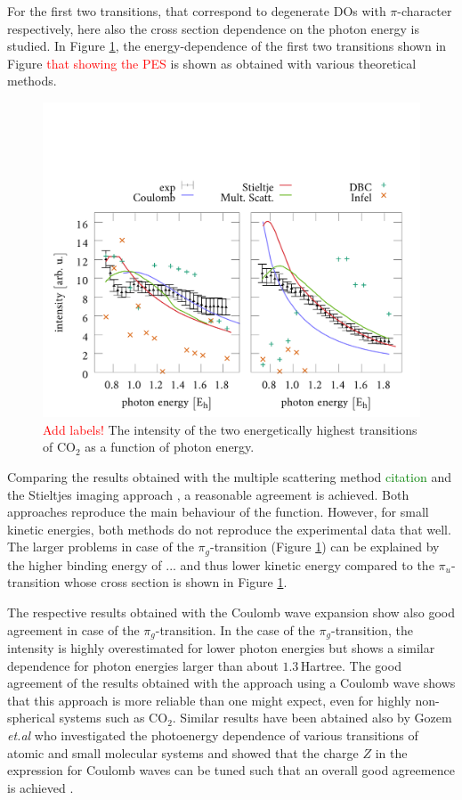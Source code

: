 For the first two transitions, that correspond to degenerate DOs with $\pi$-character respectively, here also the cross section dependence on the photon energy is studied.
In Figure \ref{fig:CO2CS}, the energy-dependence of the first two transitions shown in Figure \textcolor{red}{that showing the PES} is shown as obtained with various theoretical methods.
\begin{figure}
\includegraphics[width=\textwidth]{Figures/CO2/CrossSect}
\caption{\textcolor{red}{Add labels!} The intensity of the two energetically highest transitions of CO$_2$ as a function of photon energy.}
\label{fig:CO2CS}
\end{figure}
Comparing the results obtained with the multiple scattering method \textcolor{green}{citation} and the Stieltjes imaging approach \cite{stieltje}, a reasonable agreement is achieved.
Both approaches reproduce the main behaviour of the function.
However, for small kinetic energies, both methods do not reproduce the experimental data that well.
The larger problems in case of the $\pi_g$-transition (Figure \ref{fig:CO2CS}) can be explained by the higher binding energy of $...$ and thus lower kinetic energy compared to the $\pi_u$-transition whose cross section is shown in Figure \ref{fig:CO2CS}.

The respective results obtained with the Coulomb wave expansion show also good agreement in case of the $\pi_g$-transition.
In the case of the $\pi_g$-transition, the intensity is highly overestimated for lower photon energies but shows a similar dependence for photon energies larger than about $1.3\,$Hartree.
The good agreement of the results obtained with the approach using a Coulomb wave shows that this approach is more reliable than one might expect, even for highly non-spherical systems such as CO$_2$.
Similar results have been abtained also by Gozem \textit{et.al} who investigated the photoenergy dependence of various transitions of atomic and small molecular systems and showed that the charge $Z$ in the expression for Coulomb waves can be tuned such that an overall good agreemence is achieved \cite{do_modCoul}.

